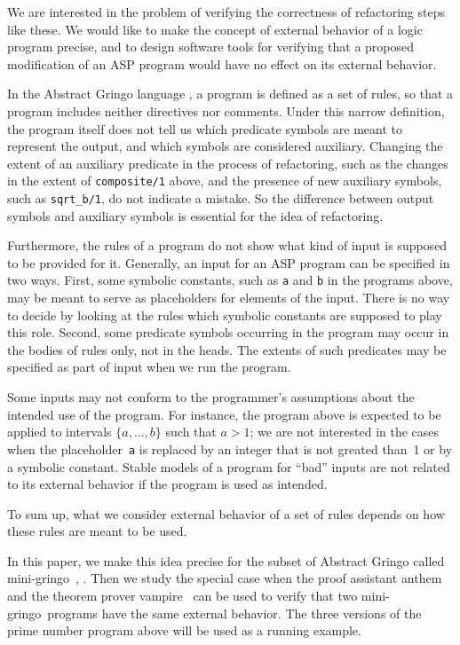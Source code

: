 \documentclass{article}
\def\gringo{{\sc gringo}}
\def\anthem{{\sc anthem}}
\def\vampire{{\sc vampire}}
\begin{document}
We are interested in the problem of verifying the correctness of
refactoring steps like these. We would like to make the concept of external
behavior of a logic program precise, and to
design software tools for verifying that a proposed modification of an
ASP program would have no effect on its external behavior.

In the Abstract Gringo language \cite{geb15}, a program is defined as
a set of rules, so that a program
includes neither directives nor comments.  Under this narrow definition,
the program itself does not tell us which predicate symbols are meant to
represent the output, and which symbols are considered
auxiliary.  Changing the
extent of an auxiliary predicate in the process of refactoring, such
as the changes in the extent of \verb|composite/1| above, and
the presence of new auxiliary symbols, such as
\verb|sqrt_b/1|, do not indicate a mistake.
So the difference between output symbols and auxiliary symbols is essential
for the idea of refactoring.

Furthermore, the rules of a program do not show what kind of input is
supposed to be provided for it.
Generally, an input for an ASP program can be specified in two ways.
First, some symbolic constants, such as {\tt a} and {\tt b} in the
programs above, may be meant to serve as placeholders for elements of
the input.
There is no way to decide by looking at the rules
which symbolic constants are supposed to play this role.
Second, some predicate symbols occurring in the program may occur in
the bodies of rules only, not in the heads.  The extents of such
predicates may be specified as part of input when we run the program.

Some inputs may not conform to the programmer's assumptions about
the intended use of the program.  For instance, the program above is
expected to be applied to intervals $\{a,\dots,b\}$ such that $a>1$;
we are not interested in the cases when the placeholder~{\tt a} is
replaced by an integer that is not greated than~1 or by a symbolic constant.
Stable models of a program for ``bad'' inputs are not related to its
external behavior if the program is used as intended.

To sum up, what we consider external behavior of a set of rules
depends on how these rules are meant to be used.

In this paper, we make this idea precise
for the subset of
Abstract Gringo called mini-\gringo\ \cite[Section~2]{fan20},
\cite[Section~2.1]{fan22}.   Then we study the special case when
the proof assistant \anthem\ 
\cite{fan20} and the theorem prover \vampire\ \cite{vor13}
 can be used to verify that two mini-\gringo\ programs have the
 same external behavior.  The three versions of the prime number program
above will be used as a running example.
\end{document}
